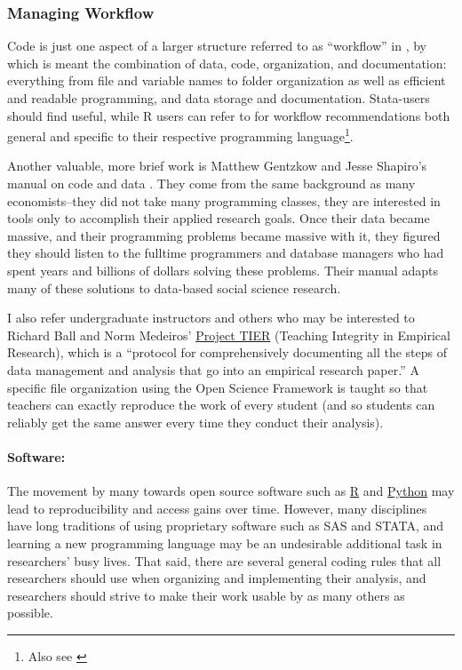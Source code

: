 \documentclass[12pt] {article}
\begin{document}
\subsubsection{Managing Workflow}\label{managing-workflow}

Code is just one aspect of a larger structure referred to as
``workflow'' in \cite{long_workflow_2008}, by which is meant the
combination of data, code, organization, and documentation: everything
from file and variable names to folder organization as well as efficient
and readable programming, and data storage and documentation. Stata-users should find \cite{long_workflow_2008} useful, while R users can refer to \cite{gandrud2013reproducible} for workflow recommendations both general and specific to their respective programming language\footnote{Also see \cite{kirchkamp_workflow_????}}.

Another valuable, more brief work is Matthew Gentzkow and Jesse Shapiro's manual on code and data \href{http://faculty.chicagobooth.edu/jesse.shapiro/research/CodeAndData.pdf}{\citep{GentzkowShapiro}}. They come from the same background as many economists--they did not take many programming classes, they are interested in tools only to accomplish their applied research goals. Once their data became massive, and their programming problems became massive with it, they figured they should listen to the fulltime programmers and database managers who had spent years and billions of dollars solving these problems. Their manual adapts many of these solutions to data-based social science research.   

I also refer undergraduate instructors and others who may be interested to Richard Ball and Norm Medeiros' \href{http://www.haverford.edu/TIER/}{Project TIER} (Teaching Integrity in Empirical Research), which is a ``protocol for comprehensively documenting all the steps of data management and analysis that go into an empirical research paper.'' A specific file organization using the Open Science Framework is taught so that teachers can exactly reproduce the work of every student (and so students can reliably get the same answer every time they conduct their analysis). 

\paragraph{Software:}
The movement by many towards open source software such
as \href{http://www.r-project.org/}{R} and \href{https://www.python.org/}{Python} may lead to reproducibility and access gains over time. However, many disciplines have long
traditions of using proprietary software such as SAS and STATA, and
learning a new programming language may be an undesirable additional
task in researchers' busy lives. That said, there are several general
coding rules that all researchers should use when organizing and
implementing their analysis, and researchers should strive to make their
work usable by as many others as possible.
\end{document}
